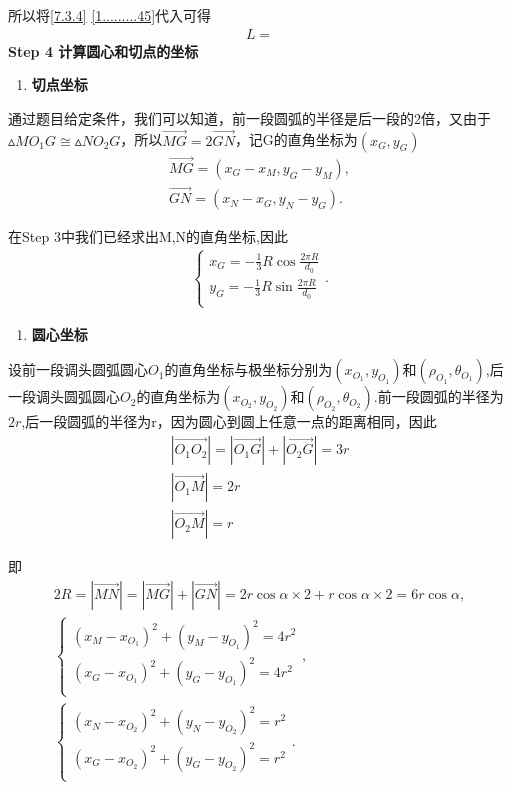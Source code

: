 \documentclass[../main.tex]{subfiles}
\begin{document}
\par 所以将\eqref{7.3.4} \eqref{1.........45}代入可得
\begin{align}\label{1.........46}
L =
\end{align}
\noindent\textbf{Step 4 计算圆心和切点的坐标}     
\begin{enumerate}
\item \textbf{切点坐标}
\end{enumerate} 
\par 通过题目给定条件，我们可以知道，前一段圆弧的半径是后一段的2倍，又由于$\vartriangle MO_1G\cong \vartriangle NO_2G$，所以$\vec{MG}=2\vec{GN}$，记G的直角坐标为$(x_{G},y_{G})$
\begin{gather}\label{1.........47}
\overrightarrow{MG}=\left( x_G-x_M,y_G-y_M \right) ,
\\
\overrightarrow{GN}=\left( x_N-x_G,y_N-y_G \right) .
\end{gather}
\par 在Step 3中我们已经求出M,N的直角坐标,因此
\begin{align}\label{1.........48}
\begin{cases}
x_G= -\frac{1}{3}R\cos\frac{2\pi R}{d_0}\\
y_G=-\frac{1}{3}R\sin\frac{2\pi R}{d_0}\\
\end{cases}.
\end{align}
\begin{enumerate}[start=2]
\item \textbf{圆心坐标}
\end{enumerate}   
\par 设前一段调头圆弧圆心$O_1$的直角坐标与极坐标分别为$(x_{O_1},y_{O_1})$和$(\rho_{O_1},\theta_{O_1})$,后一段调头圆弧圆心$O_2$的直角坐标为$(x_{O_2},y_{O_2})$和$(\rho_{O_2},\theta_{O_2})$.前一段圆弧的半径为$2r$,后一段圆弧的半径为r，因为圆心到圆上任意一点的距离相同，因此
\begin{gather}\label{1.........49}
|\overrightarrow{O_1O_2}|= |\overrightarrow{O_1G}| + |\overrightarrow{O_2G}| = 3r\\
|\overrightarrow{O_1M}|=2r   \\
|\overrightarrow{O_2M}|=r
\end{gather}
\par 即
\begin{gather}
2R=\left| \overrightarrow{MN} \right|=\left| \overrightarrow{MG} \right|+\left| \overrightarrow{GN} \right|= 2r\cos\alpha\times2 + r\cos\alpha\times2 = 6r\cos\alpha,
\\
\begin{cases}\label{1.........50}
\left( x_M-x_{O_1} \right) ^2+\left( y_M-y_{O_1} \right) ^2=4r^2\\
\left( x_G-x_{O_1} \right) ^2+\left( y_G-y_{O_1} \right) ^2=4r^2\\
\end{cases},
\\
\begin{cases}\label{1.........51}
\left( x_N-x_{O_2} \right) ^2+\left( y_N-y_{O_2} \right) ^2=r^2\\
\left( x_G-x_{O_2} \right) ^2+\left( y_G-y_{O_2} \right) ^2=r^2\\
\end{cases}.
\end{gather}
\end{document}
